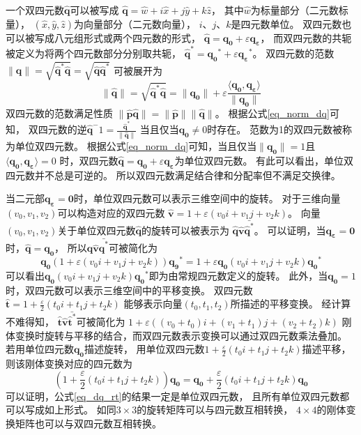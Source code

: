 一个双四元数$\hat{\bm{q}}$可以被写成
$\hat{\bm{q}}=\hat{w}+i\hat{x}+j\hat{y}+k\hat{z}$，
其中$\hat{w}$为标量部分（二元数标量），
$(\hat{x},\hat{y},\hat{z})$为向量部分（二元数向量），
$i$、$j$、$k$是四元数单位。
双四元数也可以被写成八元组形式或两个四元数的形式，
$\hat{\bm{q}}=\bm{q_0}+\varepsilon \bm{q_{\varepsilon}}$，
而双四元数的共轭被定义为将两个四元数部分分别取共轭，
$\hat{\bm{q}}^*=\bm{q_0}^*+\varepsilon \bm{q_{\varepsilon}}^*$。
双四元数的范数$\|\hat{\bm{q}}\|=
              \sqrt{\hat{\bm{q}}^* \hat{\bm{q}}} =\sqrt{\hat{\bm{q}} \hat{\bm{q}}^*}$
可被展开为
\begin{equation}
    \label{eq_norm_dq}
    \|\hat{\bm{q}}\| = 
    \sqrt{\hat{\bm{q}}^* \hat{\bm{q}}} = 
    \|\bm{q_0}\| + 
    \varepsilon \frac{\langle \bm{q_0}, \bm{q_{\varepsilon}}\rangle}{\| \bm{q_0} \|} 
\end{equation}
双四元数的范数满足性质
$\|\hat{\bm{p}}\hat{\bm{q}}\| = \|\hat{\bm{p}}\| \|\hat{\bm{q}}\|$。
根据公式\ref{eq_norm_dq}可知，
双四元数的逆$\hat{\bm{q}}^-1= \frac{\hat{\bm{q}}^*}{\|\hat{\bm{q}}\|}$
当且仅当$\bm{q_0} \neq 0$时存在。
范数为1的双四元数被称为单位双四元数。
根据公式\ref{eq_norm_dq}可知，当且仅当$\|\bm{q_0}\|=1$且
$\langle \bm{q_0}, \bm{q_{\varepsilon}}\rangle = 0$
时，双四元数$\hat{\bm{q}}=\bm{q_0}+\varepsilon \bm{q_{\varepsilon}}$为单位双四元数。
有此可以看出，单位双四元数并不总是可逆的。
所以双四元数满足结合律和分配率但不满足交换律。

当二元部$\bm{q_{\varepsilon}}=\bm{0}$时，单位双四元数可以表示三维空间中的旋转。
对于三维向量$(v_0,v_1,v_2)$可以构造对应的双四元数
$\hat{\bm{v}}=1 + \varepsilon (v_0i + v_1j + v_2k)$。
向量$(v_0,v_1,v_2)$关于单位双四元数$\hat{\bm{q}}$的旋转可以被表示为
$\hat{\bm{q}} \hat{\bm{v}} \bar{\hat{\bm{q}}^*}$。
可以证明，当$\bm{q_{\varepsilon}}=\bm{0}$时，$\hat{\bm{q}}=\bm{q_0}$，
所以$\hat{\bm{q}} \hat{\bm{v}} \bar{\hat{\bm{q}}^*}$可被简化为
\begin{equation}
    \bm{q_0}
    (
        1 + \varepsilon (v_0i + v_1j + v_2k)
    )
    \bm{q_9}^*
    =
    1 + \varepsilon \bm{q_0}(v_0i + v_1j + v_2k)\bm{q_0}^*
\end{equation}
可以看出$\bm{q_0}(v_0i + v_1j + v_2k)\bm{q_0}^*$即为由常规四元数定义的旋转。
此外，当$\bm{q_0} = 1$时，双四元数可以表示三维空间中的平移变换。
双四元数$\hat{\bm{t}} = 1 + \frac{\varepsilon}{2} (t_0i + t_1j + t_2k)$
能够表示向量$(t_0,t_1,t_2)$所描述的平移变换。
经计算不难得知，
$\hat{\bm{t}} \hat{\bm{v}} \bar{\hat{\bm{t}}^*}$可被简化为
$
1 + \varepsilon (
        (v_0 + t_0)i +
        (v_1 + t_1)j +
        (v_2 + t_2)k
    )
$
刚体变换时旋转与平移的结合，而双四元数表示变换可以通过双四元数乘法叠加。
若用单位四元数$\bm{q_0}$描述旋转，
用单位双四元数$1 + \frac{\varepsilon}{2} (t_0i + t_1j + t_2k)$描述平移，
则该刚体变换对应的四元数为
\begin{equation}
    \label{eq_dq_rt}
    (1 + \frac{\varepsilon}{2} (t_0i + t_1j + t_2k))
    \bm{q_0}
    =
    \bm{q_0} + \frac{\varepsilon}{2} (t_0i + t_1j + t_2k)\bm{q_0}
\end{equation}
可以证明，公式\ref{eq_dq_rt}的结果一定是单位双四元数，
且所有单位双四元数都可以写成如上形式。
如同$3 \times 3$的旋转矩阵可以与四元数互相转换，
$4 \times 4$的刚体变换矩阵也可以与双四元数互相转换。

